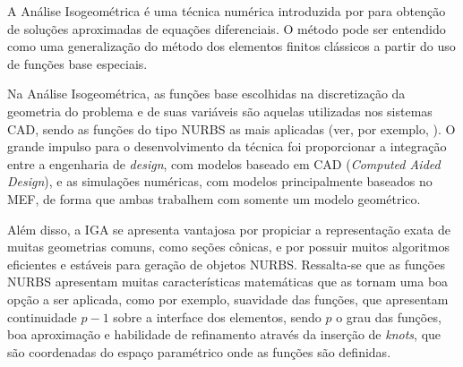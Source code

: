 \documentclass[tese_patricia]{subfiles}
\begin{document}


A Análise Isogeométrica é uma técnica numérica introduzida por \cite{HughesCB:2005} para obtenção de soluções aproximadas de equações diferenciais. O método pode ser entendido como uma generalização do método dos elementos finitos clássicos a partir do uso de funções base especiais. 

Na Análise Isogeométrica, as funções base escolhidas na discretização da geometria do problema e de suas variáveis são aquelas utilizadas nos sistemas CAD, sendo as funções do tipo NURBS as mais aplicadas (ver, por exemplo, ). O grande impulso para o desenvolvimento da técnica foi proporcionar a integração entre a engenharia de \textit{design}, com modelos baseado em CAD (\textit{Computed Aided Design}), e as simulações numéricas, com modelos principalmente baseados no MEF, de forma que ambas trabalhem com somente um modelo geométrico.

Além disso, a IGA se apresenta vantajosa por propiciar a representação exata de muitas geometrias comuns, como seções cônicas, e por possuir muitos algoritmos eficientes e estáveis para geração de objetos NURBS. Ressalta-se que as funções NURBS apresentam muitas características matemáticas que as tornam uma boa opção a ser aplicada, como por exemplo, suavidade das funções, que apresentam continuidade $p-1$ sobre a interface dos elementos, sendo $p$ o grau das funções, boa aproximação e habilidade de refinamento através da inserção de \textit{knots}, que são coordenadas do espaço paramétrico onde as funções são definidas.
\end{document}
